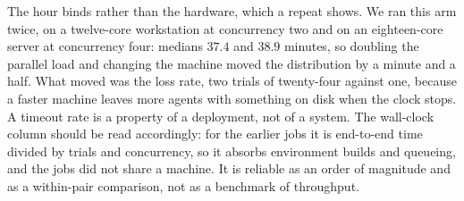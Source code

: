 The hour binds rather than the hardware, which a repeat shows. We ran this arm
twice, on a twelve-core workstation at concurrency two and on an eighteen-core
server at concurrency four: medians $37.4$ and $38.9$ minutes, so doubling the
parallel load and changing the machine moved the distribution by a minute and a
half. What moved was the loss rate, two trials of twenty-four against one,
because a faster machine leaves more agents with something on disk when the clock
stops. A timeout rate is a property of a deployment, not of a system. The
wall-clock column should be read accordingly: for the earlier jobs it is
end-to-end time divided by trials and concurrency, so it absorbs environment
builds and queueing, and the jobs did not share a machine. It is reliable as an
order of magnitude and as a within-pair comparison, not as a benchmark of
throughput.
